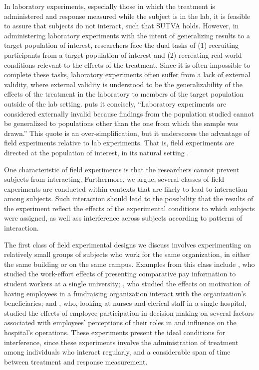 \documentclass[12pt]{article}
\begin{document}

In laboratory experiments, especially those in which the treatment is administered and response measured while the subject is in the lab, it is feasible to assure that subjects do not interact, such that SUTVA holds. However, in administering laboratory experiments with the intent of generalizing results to a target population of interest, researchers face the dual tasks of (1) recruiting participants from a target population of interest and (2) recreating real-world conditions relevant to the effects of the treatment. Since it is often impossible to complete these tasks, laboratory experiments often suffer from a lack of external validity, where external validity is understood to be the generalizability of the effects of the treatment in the laboratory to members of the target population outside of the lab setting. \citet[p.245]{lucas2003} puts it concisely, ``Laboratory experiments are considered externally invalid because findings from the population studied cannot be generalized to populations other than the one from which the sample was drawn.'' This quote is an over-simplification, but it underscores the advantage of field experiments relative to lab experiments. That is, field experiments are directed at the population of interest, in its natural setting \citep{list2014field}. 

One characteristic of field experiments is that the researchers cannot prevent subjects from interacting. Furthermore, we argue, several classes of field experiments are conducted within contexts that are likely to lead to interaction among subjects. Such interaction should lead to the possibility that the results of the experiment reflect the effects of the experimental conditions to which subjects were assigned, as well ass interference across subjects according to patterns of interaction. 

The first class of field experimental designs we discuss involves experimenting on relatively small groups of subjects who work for the same organization, in either the same building or on the same campus. Examples from this class include \citet{hennig2010search}, who studied the work-effort effects of presenting comparative pay information to student workers at a single university; \citet{grant2007impact}, who studied the effects on motivation of having employees in a fundraising organization interact with the organization's beneficiaries; and \citet{jackson1983participation}, who, looking at nurses and clerical staff in a single hospital, studied the effects of employee participation in decision making on several factors associated with employees' perceptions of their roles in and influence on the hospital's operations. These experiments present the ideal conditions for interference, since these experiments involve the administration of treatment among individuals who interact regularly, and a considerable span of time between treatment and response measurement. 
\end{document}
